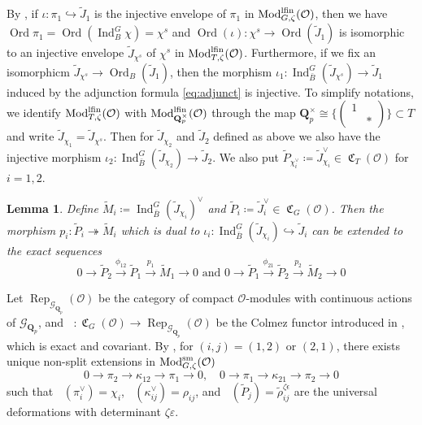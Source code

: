 \documentclass[leqno]{amsart}
\newtheorem{lem}[thm]{Lemma}
\theoremstyle{definition}
\theoremstyle{remark}
\newcommand{\smat}[1]{\left(\begin{smallmatrix} #1 \end{smallmatrix}\right)}
\newcommand{\oo}{\mathcal{O}}
\newcommand{\Qp}{\mathbf{Q}_p}
\DeclareMathOperator{\Ind}{Ind}
\DeclareMathOperator{\Mod}{\textnormal{Mod}}
\DeclareMathOperator{\fC}{\mathfrak{C}} %
\DeclareMathOperator{\Rep}{Rep}
\DeclareMathOperator{\V}{\check{\mathbf{V}}} %
\DeclareMathOperator{\Ord}{Ord} %
\newcommand{\Gp}{\mathcal{G}_{\Qp}} %
\newcommand{\sm}{\textnormal{sm}}
\newcommand{\lfin}{\textnormal{lfin}}
\begin{document}
By \cite[Prop 7.1]{pask},
if $\iota\colon \pi_1\hookrightarrow \tilde{J}_1$
is the injective envelope of $\pi_1$
in $\Mod^{\lfin}_{G,\zeta}(\oo)$,
then we have $\Ord\pi_1=\Ord(\Ind_B^G\chi)=\chi^s$
and $\Ord(\iota)\colon \chi^s \to \Ord(\tilde{J}_1)$
is isomorphic to an injective envelope
$\tilde{J}_{\chi^s}$ of $\chi^s$
in $\Mod^{\lfin}_{T,\zeta}(\oo)$.
Furthermore, if we fix an isomorphicm 
$\tilde{J}_{\chi^s}\to \Ord_B(\tilde{J}_1)$, then the morphism 
$\iota_1\colon \Ind_{\bar{B}}^G(\tilde{J}_{\chi^s})\to
\tilde{J}_1$
induced by the adjunction formula \eqref{eq:adjunct} is injective.
To simplify notations,
we identify $\Mod^{\lfin}_{T,\zeta}(\oo)$
with $\Mod^{\lfin}_{\Qp^\times}(\oo)$ through 
the map $\Qp^\times\cong \{\smat{1&\\&*}\}\subset T$
and write $\tilde{J}_{\chi_1}=\tilde{J}_{\chi^s}$.
Then for $ \tilde{J}_{\chi_2}$
and $ \tilde{J}_2$ defined as above
we also have the injective morphism
$\iota_2\colon \Ind_{\bar{B}}^G(\tilde{J}_{\chi_2})\to
\tilde{J}_2$.
We also put
$\tilde{P}_{\chi_i^\vee}\coloneqq \tilde{J}_{\chi_i}^\vee
\in\fC_T(\oo)$ for $i=1,2$.

\begin{lem}\cite[Cor 7.7]{pask}
\label{lem:proj_enve}
Define $\tilde{M}_i\coloneqq 
\Ind_{\bar{B}}^G(\tilde{J}_{\chi_i})^\vee$ and 
$\tilde{P}_i\coloneqq \tilde{J}_i^\vee\in\fC_G(\oo)$.
Then the morphism
$p_i\colon \tilde{P}_i\twoheadrightarrow \tilde{M}_i$
which is dual to 
$\iota_i\colon 
\Ind_{\bar{B}}^G(\tilde{J}_{\chi_i})\hookrightarrow 
\tilde{J}_i$
can be extended to the exact sequences
\begin{equation}\label{eq:exact_PPM}
	0\to \tilde{P}_{2}\xrightarrow{\phi_{12}} 
	\tilde{P}_{1}\xrightarrow{p_1} \tilde{M}_1\to 0 
	\text{ and }
	0\to \tilde{P}_{1}\xrightarrow{\phi_{21}} 
	\tilde{P}_{2}\xrightarrow{p_2} \tilde{M}_2\to 0
\end{equation}
\end{lem}

Let $\Rep_{\Gp}(\oo)$
be the category of compact $\oo$-modules with
continuous actions of $\Gp$,
and $\V\colon \fC_G(\oo)\to \Rep_{\Gp}(\oo)$
be the Colmez functor introduced 
in \cite[\S 5.7]{pask},
which is exact and covariant.
By \cite[Cor 8.7]{pask},
for $(i,j)=(1,2)$ or  $(2,1)$,
there exists unique non-split extensions
in $\Mod^{\sm}_{G,\zeta}(\oo)$ 
\[
	0\to \pi_2\to \kappa_{12}\to \pi_1\to 0,\quad
	0\to \pi_1\to \kappa_{21}\to \pi_2\to 0
\]
such that
$\V(\pi_i^\vee)=\chi_i$, $\V(\kappa_{ij}^\vee)=\rho_{ij}$,
and $\V(\tilde{P}_j)=\tilde{\rho}^{\zeta\epsilon}_{ij}$
are the universal deformations
with determinant $\zeta\varepsilon$.
\end{document}
